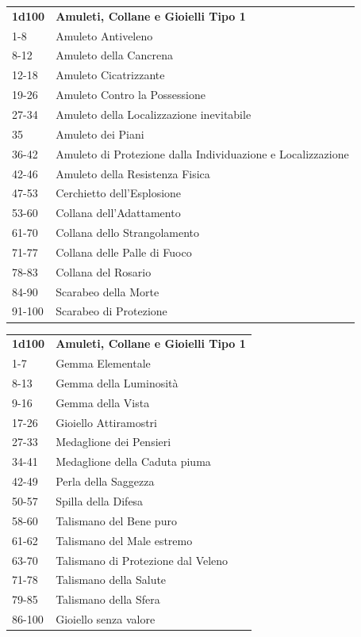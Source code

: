 \begin{multicols}{2}
\begin{tabularx}{0.45\textwidth}{lX}
\textbf{1d100} & \textbf{Amuleti, Collane e Gioielli Tipo 1}\\
1-8   & Amuleto Antiveleno\\
8-12  & Amuleto della Cancrena\\
12-18 & Amuleto Cicatrizzante\\
19-26 & Amuleto Contro la Possessione\\
27-34 & Amuleto della Localizzazione inevitabile\\
35    & Amuleto dei Piani\\
36-42 & Amuleto di Protezione dalla Individuazione e Localizzazione\\
42-46 & Amuleto della Resistenza Fisica\\
47-53 & Cerchietto dell'Esplosione\\
53-60 & Collana dell'Adattamento\\
61-70 & Collana dello Strangolamento\\
71-77 & Collana delle Palle di Fuoco\\
78-83 & Collana del Rosario\\
84-90 & Scarabeo della Morte\\
91-100 & Scarabeo di Protezione\\
\end{tabularx}

\medskip

\begin{tabularx}{0.45\textwidth}{lX}
\textbf{1d100} & \textbf{Amuleti, Collane e Gioielli Tipo 1}\\
1-7 & Gemma Elementale\\
8-13& Gemma della Luminosità\\
9-16& Gemma della Vista\\
17-26& Gioiello Attiramostri\\
27-33& Medaglione dei Pensieri\\
34-41& Medaglione della Caduta piuma\\
42-49& Perla della Saggezza\\
50-57& Spilla della Difesa\\
58-60& Talismano del Bene puro\\
61-62& Talismano del Male estremo\\
63-70& Talismano di Protezione dal Veleno\\
71-78& Talismano della Salute\\
79-85& Talismano della Sfera\\
86-100& Gioiello senza valore
\end{tabularx}



\end{multicols}
